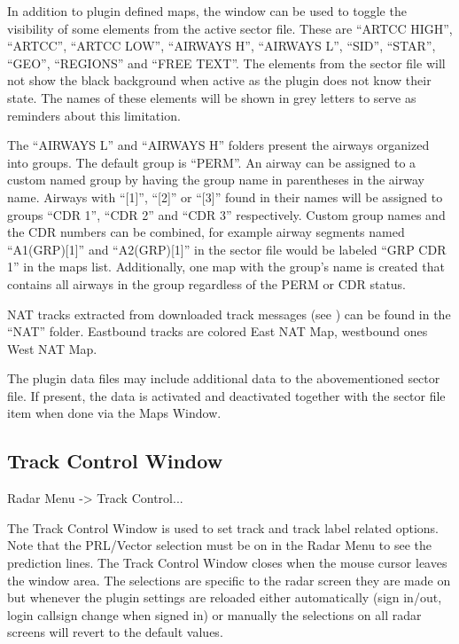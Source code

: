 \documentclass[11pt,a4paper,oldfontcommands]{memoir}
\begin{document}
In addition to plugin defined maps, the window can be used to toggle the visibility of some elements from the active sector file. These are “ARTCC HIGH”, “ARTCC”, “ARTCC LOW”, “AIRWAYS H”, “AIRWAYS L”, “SID”, “STAR”, “GEO”, “REGIONS” and “FREE TEXT”. The elements from the sector file will not show the black background when active as the plugin does not know their state. The names of these elements will be shown in grey letters to serve as reminders about this limitation.

The “AIRWAYS L” and “AIRWAYS H” folders present the airways organized into groups. The default group is “PERM”. An airway can be assigned to a custom named group by having the group name in parentheses in the airway name. Airways with “[1]”, “[2]” or “[3]” found in their names will be assigned to groups “CDR 1”, “CDR 2” and “CDR 3” respectively. Custom group names and the CDR numbers can be combined, for example airway segments named “A1(GRP)[1]” and “A2(GRP)[1]” in the sector file would be labeled “GRP CDR 1” in the maps list. Additionally, one map with the group’s name is created that contains all airways in the group regardless of the PERM or CDR status.

NAT tracks extracted from downloaded track messages (see \textit{}) can be found in the “NAT” folder. Eastbound tracks are colored East NAT Map, westbound ones West NAT Map.

The plugin data files may include additional data to the abovementioned sector file. If present, the data is activated and deactivated together with the sector file item when done via the Maps Window.

\subsection{Track Control Window}
\label{win:tcw}

Radar Menu -> Track Control...

The Track Control Window is used to set track and track label related options. Note that the PRL/Vector selection must be on in the Radar Menu to see the prediction lines. The Track Control Window closes when the mouse cursor leaves the window area. The selections are specific to the radar screen they are made on but whenever the plugin settings are reloaded either automatically (sign in/out, login callsign change when signed in) or manually the selections on all radar screens will revert to the default values.
\end{document}
